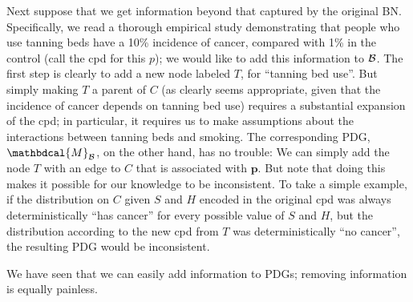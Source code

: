 \documentclass[letterpaper]{article} %
\theoremstyle{plain}
\theoremstyle{definition}
\theoremstyle{remark}
\newcommand\mat[1]{\mathbf{#1}}
\newcommand{\dg}[1]{\mathbdcal{#1}}
\newcommand{\PDGof}[1]{{\dg M}_{#1}}
\begin{document}
\begin{example}[emulating a BN]
Next suppose that we get information beyond that captured by the original BN.
Specifically, we read a thorough empirical study demonstrating that people who
use tanning beds have a 10\% incidence of cancer, compared with 1\% in the
control (call the cpd for this $p$); we would like to add this information to
$\cal B$. The first step is clearly to add a new node labeled $T$, for ``tanning
bed use''.  But simply making $T$ a parent of $C$ (as clearly seems appropriate,
given that the incidence of cancer depends on tanning bed use) requires a
substantial expansion of the cpd; in particular, it requires us to make
assumptions about the interactions between tanning beds and smoking.  
%
The corresponding PDG, $\PDGof{{\mathcal B}}$, on the other hand, has no
trouble: We can simply add the node $T$ with an edge to $C$ that is associated
with $\mat p$.  But note that doing this makes it possible for our knowledge to
be inconsistent. To take a simple example, if the distribution on $C$ given $S$
and $H$ encoded in the original cpd was always deterministically ``has cancer''
for every possible value of $S$ and $H$, but the distribution according to the
new cpd from $T$ was deterministically ``no cancer'', the resulting PDG would be
inconsistent.  
%
\end{example}


We have seen that we can easily add information to PDGs; removing information is
equally painless.   
\end{document}
